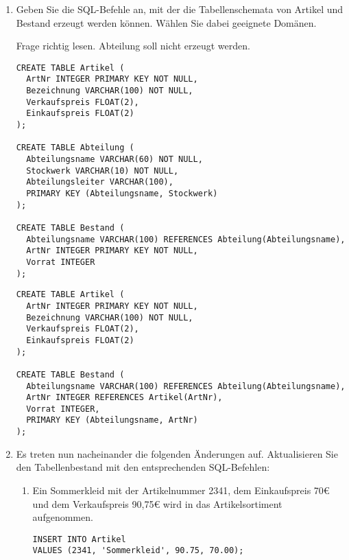 \documentclass{lehramt-informatik-haupt}
\begin{document}
\begin{enumerate}
\item Geben Sie die SQL-Befehle an, mit der die Tabellenschemata von
Artikel und Bestand erzeugt werden können. Wählen Sie dabei geeignete
Domänen.

Frage richtig lesen. Abteilung soll nicht erzeugt werden.

\begin{antwort}[falsch]
\begin{verbatim}
CREATE TABLE Artikel (
  ArtNr INTEGER PRIMARY KEY NOT NULL,
  Bezeichnung VARCHAR(100) NOT NULL,
  Verkaufspreis FLOAT(2),
  Einkaufspreis FLOAT(2)
);

CREATE TABLE Abteilung (
  Abteilungsname VARCHAR(60) NOT NULL,
  Stockwerk VARCHAR(10) NOT NULL,
  Abteilungsleiter VARCHAR(100),
  PRIMARY KEY (Abteilungsname, Stockwerk)
);

CREATE TABLE Bestand (
  Abteilungsname VARCHAR(100) REFERENCES Abteilung(Abteilungsname),
  ArtNr INTEGER PRIMARY KEY NOT NULL,
  Vorrat INTEGER
);
\end{verbatim}
\end{antwort}

\begin{antwort}[muster]
\begin{verbatim}
CREATE TABLE Artikel (
  ArtNr INTEGER PRIMARY KEY NOT NULL,
  Bezeichnung VARCHAR(100) NOT NULL,
  Verkaufspreis FLOAT(2),
  Einkaufspreis FLOAT(2)
);

CREATE TABLE Bestand (
  Abteilungsname VARCHAR(100) REFERENCES Abteilung(Abteilungsname),
  ArtNr INTEGER REFERENCES Artikel(ArtNr),
  Vorrat INTEGER,
  PRIMARY KEY (Abteilungsname, ArtNr)
);
\end{verbatim}
\end{antwort}


\item Es treten nun nacheinander die folgenden Änderungen auf.
Aktualisieren Sie den Tabellenbestand mit den entsprechenden
SQL-Befehlen:

\begin{enumerate}


\item Ein Sommerkleid mit der Artikelnummer 2341, dem Einkaufspreis 70€
und dem Verkaufspreis 90,75€ wird in das Artikelsortiment aufgenommen.

\begin{antwort}[muster]
\begin{verbatim}
INSERT INTO Artikel
VALUES (2341, 'Sommerkleid', 90.75, 70.00);
\end{verbatim}
\end{antwort}


\end{enumerate}
\end{enumerate}
\end{document}
